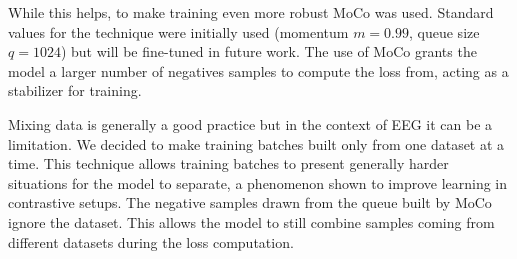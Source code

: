 While this helps, to make training even more robust MoCo was used.
Standard values for the technique were initially used (momentum $m=0.99$, queue size $q=1024$) but will be fine-tuned in future work.
The use of MoCo grants the model a larger number of negatives samples to compute the loss from, acting as a stabilizer for training.

Mixing data is generally a good practice but in the context of EEG it can be a limitation.
We decided to make training batches built only from one dataset at a time.
This technique allows training batches to present generally harder situations for the model to separate, a phenomenon shown to improve learning in contrastive setups.
The negative samples drawn from the queue built by MoCo ignore the dataset.
This allows the model to still combine samples coming from different datasets during the loss computation.

